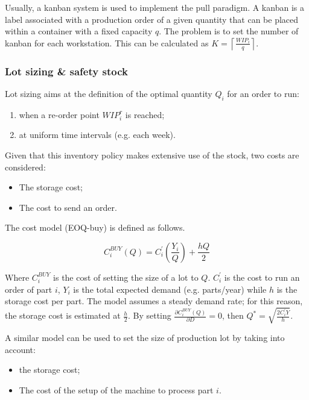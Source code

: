 Usually, a kanban system is used to implement the pull paradigm. A kanban is a label associated with a production order of a given quantity that can be placed within a container with a fixed capacity $q$. The problem is to set the number of kanban for each workstation. This can be calculated as $K=\left\lceil\frac{WIP_i}{q}\right\rceil$.

\subsubsection{Lot sizing \& safety stock}
Lot sizing aims at the definition of the optimal quantity $Q_i$ for an order to run:
\begin{enumerate}
    \item when a re-order point $WIP_i^r$ is reached;
	\item at uniform time intervals (e.g. each week).

\end{enumerate}

Given that this inventory policy makes extensive use of the stock, two costs are considered:

\begin{itemize}
    \item The storage cost;
    \item The cost to send an order.

\end{itemize}

The cost model (EOQ-buy) is defined as follows.

\begin{equation}
    C_i^{BUY}\left(Q\right)=C_i^\prime\left(\frac{Y_i}{Q}\right)+\frac{hQ}{2}
\end{equation}

Where $C_i^{BUY}$ is the cost of setting the size of a lot to $Q$. $C_i^\prime$ is the cost to run an order of part $i$, $Y_i$ is the total expected demand (e.g. parts/year) while $h$ is the storage cost per part. The model assumes a steady demand rate; for this reason, the storage cost is estimated at $\frac{h}{2}$. By setting $\frac{\partial C_i^{BUY}(Q)}{\partial D}=0$, then $Q^\ast=\sqrt{\frac{2C_i^\prime Y}{h}}$.\par

A similar model can be used to set the size of production lot by taking into account:
\begin{itemize}
    \item the storage cost;
    \item The cost of the setup of the machine to process part $i$.

\end{itemize}

